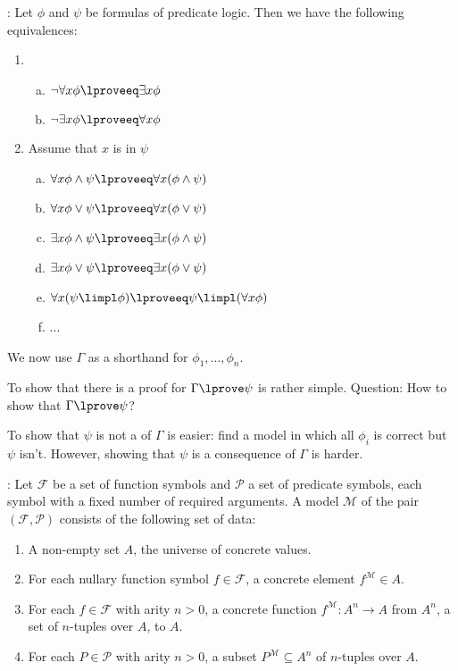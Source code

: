     : Let $\phi$ and $\psi$ be formulas of predicate logic. Then we have the following equivalences:
      \begin{enumerate}[1.]
        \item
        \begin{enumerate}[(a)]
          \item $\lnot \forall x \phi \lproveeq \exists x \phi$
          \item $\lnot \exists x \phi \lproveeq \forall x \phi$
        \end{enumerate}
        \item Assume that $x$ is  in $\psi$
        \begin{enumerate}[(a)]
          \item $\forall x \phi \land \psi \lproveeq \forall x (\phi \land \psi)$
          \item $\forall x \phi \lor \psi \lproveeq \forall x (\phi \lor \psi)$
          \item $\exists x \phi \land \psi \lproveeq \exists x (\phi \land \psi)$
          \item $\exists x \phi \lor \psi \lproveeq \exists x (\phi \lor \psi)$
          \item $\forall x (\psi \limpl \phi) \lproveeq \psi \limpl (\forall x \phi)$
          \item ...
        \end{enumerate}
      \end{enumerate}

  \par We now use $\Gamma$ as a shorthand for $\phi_1, \ldots, \phi_n$.
  \par To show that there is a proof for $\Gamma \lprove \psi$ is rather simple. Question: How to show that  $\Gamma \lprove \psi$?
  \par To show that $\psi$ is not a  of $\Gamma$ is easier: find a model in which all $\phi_i$ is correct but $\psi$ isn't. However, showing that $\psi$ is a consequence of $\Gamma$ is harder.

    : Let $\mathcal{F}$ be a set of function symbols and $\mathcal{P}$ a set of predicate symbols, each symbol with a fixed number of required arguments. A model $\mathcal{M}$ of the pair $(\mathcal{F}, \mathcal{P})$ consists of the following set of data:
    \begin{enumerate}[1.]
      \item A non-empty set $A$, the universe of concrete values.
      \item For each nullary function symbol $f \in \mathcal{F}$, a concrete element $f^{\mathcal{M}} \in A$.
      \item For each $f \in \mathcal{F}$ with arity $n > 0$, a concrete function $f^{\mathcal{M}}: A^n \to A$ from $A^n$, a set of $n$-tuples over $A$, to $A$.
      \item For each $P \in \mathcal{P}$ with arity $n > 0$, a subset $P^{\mathcal{M}} \subseteq A^n$ of $n$-tuples over $A$.
    \end{enumerate}

